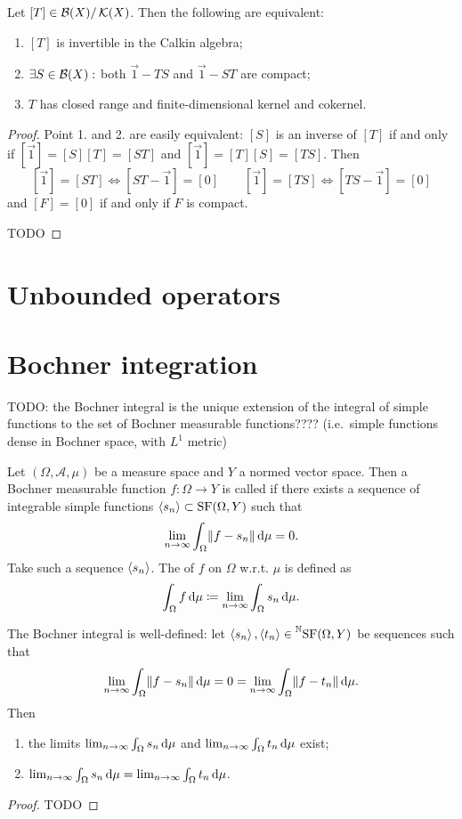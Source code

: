 \begin{proposition}
Let $[T]\in\operatorname{\mathcal{B}}(X)/\operatorname{\mathcal{K}}(X)$. Then the following are equivalent:
\begin{enumerate}
\item $[T]$ is invertible in the Calkin algebra;
\item $\exists S\in\operatorname{\mathcal{B}}(X):$ both $\vec{1}-TS$ and $\vec{1}-ST$ are compact;
\item $T$ has closed range and finite-dimensional kernel and cokernel. 
\end{enumerate}
\end{proposition}
\begin{proof}
Point 1. and 2. are easily equivalent: $[S]$ is an inverse of $[T]$ if and only if $[\vec{1}] = [S][T] = [ST]$ and $[\vec{1}] = [T][S] = [TS]$. Then
\[ [\vec{1}] = [ST] \iff [ST - \vec{1}] = [0] \qquad [\vec{1}] = [TS] \iff [TS - \vec{1}] = [0] \]
and $[F]=[0]$ if and only if $F$ is compact.

TODO
\end{proof}

\section{Unbounded operators}

\section{Bochner integration}

TODO: the Bochner integral is the unique extension of the integral of simple functions to the set of Bochner measurable functions???? (i.e.\ simple functions dense in Bochner space, with $L^1$ metric)
\begin{definition}
Let $(\Omega, \mathcal{A},\mu)$ be a measure space and $Y$ a normed vector space. Then a Bochner measurable function $f:\Omega\to Y$ is called  if there exists a sequence of integrable simple functions $\left\langle s_n \right\rangle\subset\operatorname{SF}(\Omega,Y)$ such that
\[ \lim_{n\to\infty}\int_\Omega \lVert f-s_n\rVert\operatorname{d \!}{\mu} = 0. \]
Take such a sequence $\left\langle s_n \right\rangle$. The  of $f$ on $\Omega$ w.r.t. $\mu$ is defined as
\[ \int_\Omega f\operatorname{d \!}{\mu} \coloneqq \lim_{n\to\infty}\int_\Omega s_n\operatorname{d \!}{\mu}. \]
\end{definition}

\begin{lemma}
The Bochner integral is well-defined: let $\left\langle s_n \right\rangle,\left\langle t_n \right\rangle\in \prescript{\mathbb{N}}{}{\operatorname{SF}(\Omega,Y)}$ be sequences such that
\[ \lim_{n\to\infty}\int_\Omega \lVert f-s_n\rVert\operatorname{d \!}{\mu} = 0 = \lim_{n\to\infty}\int_\Omega \lVert f-t_n\rVert\operatorname{d \!}{\mu}.  \]
Then
\begin{enumerate}
\item the limits $\lim_{n\to\infty}\int_\Omega s_n\operatorname{d \!}{\mu}$ and $\lim_{n\to\infty}\int_\Omega t_n\operatorname{d \!}{\mu}$ exist;
\item $\lim_{n\to\infty}\int_\Omega s_n\operatorname{d \!}{\mu} = \lim_{n\to\infty}\int_\Omega t_n\operatorname{d \!}{\mu}$.
\end{enumerate}
\end{lemma}
\begin{proof}
TODO
\end{proof}


